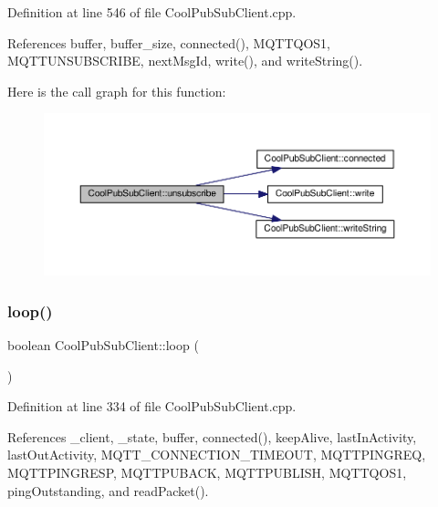 Definition at line 546 of file Cool\+Pub\+Sub\+Client.\+cpp.



References buffer, buffer\+\_\+size, connected(), M\+Q\+T\+T\+Q\+O\+S1, M\+Q\+T\+T\+U\+N\+S\+U\+B\+S\+C\+R\+I\+BE, next\+Msg\+Id, write(), and write\+String().

Here is the call graph for this function\+:\nopagebreak
\begin{figure}[H]
\begin{center}
\leavevmode
\includegraphics[width=350pt]{d8/d4b/class_cool_pub_sub_client_a850554280e314d6b5c33c73fd9e809fc_cgraph}
\end{center}
\end{figure}
\mbox{\label{class_cool_pub_sub_client_afc15900f0fc4886a19394508e61793b8}} 
\subsubsection{\texorpdfstring{loop()}{loop()}}
{\footnotesize\ttfamily boolean Cool\+Pub\+Sub\+Client\+::loop (\begin{DoxyParamCaption}{ }\end{DoxyParamCaption})}



Definition at line 334 of file Cool\+Pub\+Sub\+Client.\+cpp.



References \+\_\+client, \+\_\+state, buffer, connected(), keep\+Alive, last\+In\+Activity, last\+Out\+Activity, M\+Q\+T\+T\+\_\+\+C\+O\+N\+N\+E\+C\+T\+I\+O\+N\+\_\+\+T\+I\+M\+E\+O\+UT, M\+Q\+T\+T\+P\+I\+N\+G\+R\+EQ, M\+Q\+T\+T\+P\+I\+N\+G\+R\+E\+SP, M\+Q\+T\+T\+P\+U\+B\+A\+CK, M\+Q\+T\+T\+P\+U\+B\+L\+I\+SH, M\+Q\+T\+T\+Q\+O\+S1, ping\+Outstanding, and read\+Packet().



